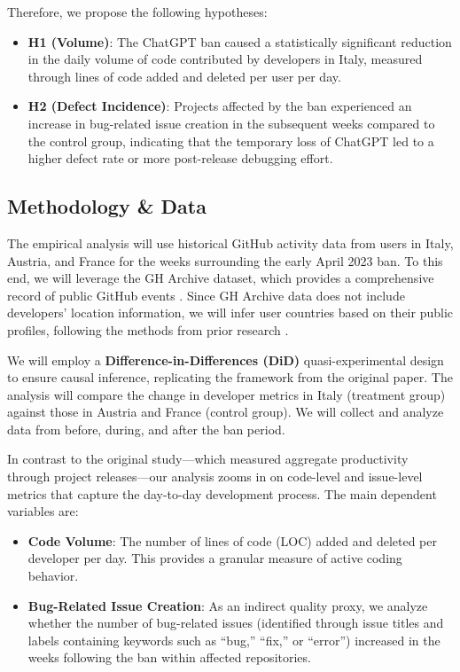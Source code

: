 \pagebreak[3]

Therefore, we propose the following hypotheses:

\begin{itemize}
  \item \textbf{H1 (Volume)}: The ChatGPT ban caused a statistically significant reduction in the daily volume of code contributed by developers in Italy, measured through lines of code added and deleted per user per day.
  \item \textbf{H2 (Defect Incidence)}: Projects affected by the ban experienced an increase in bug-related issue creation in the subsequent weeks compared to the control group, indicating that the temporary loss of ChatGPT led to a higher defect rate or more post-release debugging effort.
\end{itemize}


\subsection*{Methodology \& Data}

The empirical analysis will use historical GitHub activity data from users in Italy, Austria, and France for the weeks surrounding the early April 2023 ban. To this end, we will leverage the GH Archive dataset, which provides a comprehensive record of public GitHub events \cite{github_archive}. Since GH Archive data does not include developers’ location information, we will infer user countries based on their public profiles, following the methods from prior research \cite{Kreitmeir2023}.

We will employ a \textbf{Difference-in-Differences (DiD)} quasi-experimental design to ensure causal inference, replicating the framework from the original paper. The analysis will compare the change in developer metrics in Italy (treatment group) against those in Austria and France (control group). We will collect and analyze data from before, during, and after the ban period. 

In contrast to the original study—which measured aggregate productivity through project releases—our analysis zooms in on code-level and issue-level metrics that capture the day-to-day development process. The main dependent variables are:

\begin{itemize}
  \item \textbf{Code Volume}: The number of lines of code (LOC) added and deleted per developer per day. This provides a granular measure of active coding behavior.
  \item \textbf{Bug-Related Issue Creation}: As an indirect quality proxy, we analyze whether the number of bug-related issues (identified through issue titles and labels containing keywords such as “bug,” “fix,” or “error”) increased in the weeks following the ban within affected repositories.
\end{itemize}

